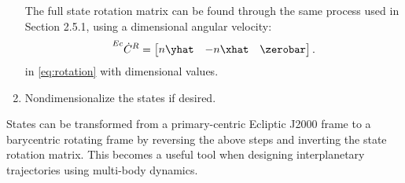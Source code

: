 \begin{enumerate}
            The full state rotation matrix can be found through the same process used in Section
            2.5.1, using a dimensional angular velocity:
            \begin{equation}
                \prescript{Ec}{}{\dot{C}}^{R}=\begin{bmatrix}   n\yhat  &   -n\xhat &   \zerobar    \end{bmatrix}.
                \label{eq:eclipticvelocityrotation}
            \end{equation}
            in \cref{eq:rotation} with dimensional values.
    \item   Nondimensionalize the states if desired.
\end{enumerate}
States can be transformed from a primary-centric Ecliptic J2000 frame to a barycentric rotating
frame by reversing the above steps and inverting the state rotation matrix. This becomes a useful
tool when designing interplanetary trajectories using multi-body dynamics.
